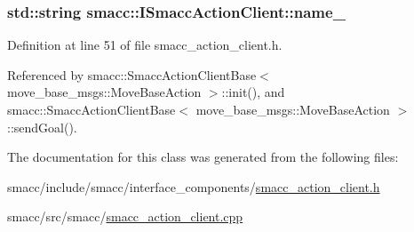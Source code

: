 \subsubsection[{\texorpdfstring{name\+\_\+}{name_}}]{\setlength{\rightskip}{0pt plus 5cm}std\+::string smacc\+::\+I\+Smacc\+Action\+Client\+::name\+\_\+\hspace{0.3cm}{\ttfamily [protected]}}\hypertarget{classsmacc_1_1ISmaccActionClient_aec84a0169bf40d394207540ad75b364e}{}\label{classsmacc_1_1ISmaccActionClient_aec84a0169bf40d394207540ad75b364e}


Definition at line 51 of file smacc\+\_\+action\+\_\+client.\+h.



Referenced by smacc\+::\+Smacc\+Action\+Client\+Base$<$ move\+\_\+base\+\_\+msgs\+::\+Move\+Base\+Action $>$\+::init(), and smacc\+::\+Smacc\+Action\+Client\+Base$<$ move\+\_\+base\+\_\+msgs\+::\+Move\+Base\+Action $>$\+::send\+Goal().



The documentation for this class was generated from the following files\+:\begin{DoxyCompactItemize}
\item 
smacc/include/smacc/interface\+\_\+components/\hyperlink{smacc__action__client_8h}{smacc\+\_\+action\+\_\+client.\+h}\item 
smacc/src/smacc/\hyperlink{smacc__action__client_8cpp}{smacc\+\_\+action\+\_\+client.\+cpp}\end{DoxyCompactItemize}
